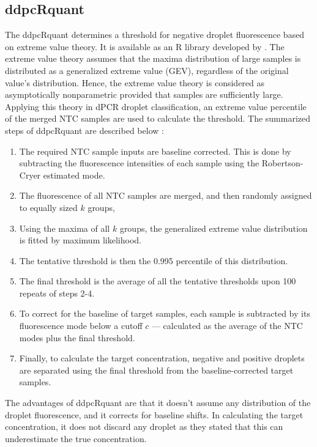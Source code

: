 \subsection{ddpcRquant}
\label{sec:ddpcrquant}
The ddpcRquant determines a threshold for negative droplet fluorescence based on extreme value theory. It is available as an R library developed by . The extreme value theory assumes that the maxima distribution of large samples is distributed as a generalized extreme value (GEV), regardless of the original value's distribution. Hence, the extreme value theory is considered as asymptotically nonparametric provided that samples are sufficiently large. Applying this theory in dPCR droplet classification, an extreme value percentile of the merged NTC samples are used to calculate the threshold. The summarized steps of ddpcRquant are described below :
\begin{enumerate}
    \item The required NTC sample inputs are baseline corrected. This is done by subtracting the fluorescence intensities of each sample using the Robertson-Cryer estimated mode.
    \item The fluorescence of all NTC samples are merged, and then randomly assigned to equally sized \(k\) groups, 
    \item Using the maxima of all \(k\) groups, the generalized extreme value distribution is fitted by maximum likelihood.
    \item The tentative threshold is then the 0.995 percentile of this distribution.
    \item The final threshold is the average of all the tentative thresholds upon 100 repeats of steps 2-4.
    \item To correct for the baseline of target samples, each sample is subtracted by its fluorescence mode below a cutoff \(c\) — calculated as the average of the NTC modes plus the final threshold.
    \item Finally, to calculate the target concentration, negative and positive droplets are separated using the final threshold from the baseline-corrected target samples. 
\end{enumerate}

The advantages of ddpcRquant are that it doesn't assume any distribution of the droplet fluorescence, and it corrects for baseline shifts. In calculating the target concentration, it does not discard any droplet as they stated that this can underestimate the true concentration.

